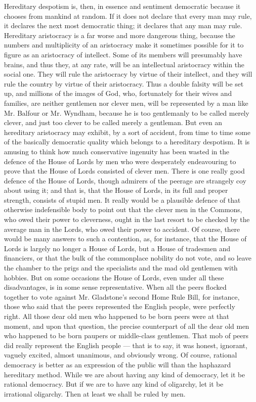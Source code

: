 Hereditary despotism is, then, in essence and sentiment democratic because it chooses from mankind at random. If it does not declare that every man may rule, it declares the next most democratic thing; it declares that any man may rule. Hereditary aristocracy is a far worse and more dangerous thing, because the numbers and multiplicity of an aristocracy make it sometimes possible for it to figure as an aristocracy of intellect. Some of its members will presumably have brains, and thus they, at any rate, will be an intellectual aristocracy within the social one. They will rule the aristocracy by virtue of their intellect, and they will rule the country by virtue of their aristocracy. Thus a double falsity will be set up, and millions of the images of God, who, fortunately for their wives and families, are neither gentlemen nor clever men, will be represented by a man like Mr. Balfour or Mr. Wyndham, because he is too gentlemanly to be called merely clever, and just too clever to be called merely a gentleman. But even an hereditary aristocracy may exhibit, by a sort of accident, from time to time some of the basically democratic quality which belongs to a hereditary despotism. It is amusing to think how much conservative ingenuity has been wasted in the defence of the House of Lords by men who were desperately endeavouring to prove that the House of Lords consisted of clever men. There is one really good defence of the House of Lords, though admirers of the peerage are strangely coy about using it; and that is, that the House of Lords, in its full and proper strength, consists of stupid men. It really would be a plausible defence of that otherwise indefensible body to point out that the clever men in the Commons, who owed their power to cleverness, ought in the last resort to be checked by the average man in the Lords, who owed their power to accident. Of course, there would be many answers to such a contention, as, for instance, that the House of Lords is largely no longer a House of Lords, but a House of tradesmen and financiers, or that the bulk of the commonplace nobility do not vote, and so leave the chamber to the prigs and the specialists and the mad old gentlemen with hobbies. But on some occasions the House of Lords, even under all these disadvantages, is in some sense representative. When all the peers flocked together to vote against Mr. Gladstone’s second Home Rule Bill, for instance, those who said that the peers represented the English people, were perfectly right. All those dear old men who happened to be born peers were at that moment, and upon that question, the precise counterpart of all the dear old men who happened to be born paupers or middle-class gentlemen. That mob of peers did really represent the English people — that is to say, it was honest, ignorant, vaguely excited, almost unanimous, and obviously wrong. Of course, rational democracy is better as an expression of the public will than the haphazard hereditary method. While we are about having any kind of democracy, let it be rational democracy. But if we are to have any kind of oligarchy, let it be irrational oligarchy. Then at least we shall be ruled by men.

